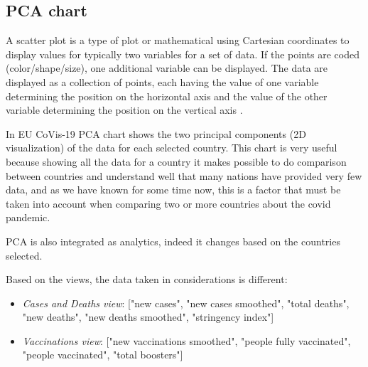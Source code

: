 \documentclass[10pt,conference]{IEEEtran}
\begin{document}
\subsection{PCA chart}
A scatter plot is a type of plot or mathematical
using Cartesian coordinates to display values for typically two variables for a set of data. If the points are coded (color/shape/size), 
one additional variable can be displayed. The data are displayed as a collection of points, each having the value of one variable 
determining the position on the horizontal axis and the value of the other variable determining the position on the vertical axis \cite{scatter}.

In EU CoVis-19 PCA chart shows the two principal components (2D visualization) of the data for each selected country. This chart is very useful because showing all the data for a country it makes possible to do comparison between 
countries and understand well that many nations have provided very few data, and as we have known for some time now, this is a factor that must be taken into account when comparing two or more countries about the covid pandemic.

PCA is also integrated as analytics, indeed it changes based on the countries selected.

Based on the views, the data taken in considerations is different:
\begin{itemize}
	\item {\em Cases and Deaths view}: ["new cases", "new cases smoothed", "total deaths", "new deaths", "new deaths smoothed", "stringency index"]
	\item {\em Vaccinations view}: ["new vaccinations smoothed", "people fully vaccinated", "people vaccinated", "total boosters"]
\end{itemize}

\begin{figure}
\end{figure}
\end{document}
